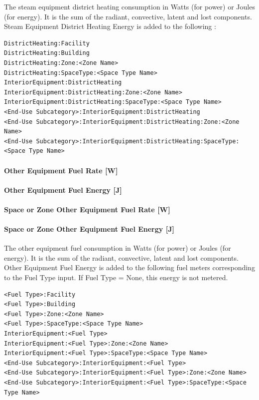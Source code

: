 The steam equipment district heating consumption in Watts (for power) or Joules (for energy). It is the sum of the radiant, convective, latent and lost components. Steam Equipment District Heating Energy is added to the following :

\begin{lstlisting}
DistrictHeating:Facility
DistrictHeating:Building
DistrictHeating:Zone:<Zone Name>
DistrictHeating:SpaceType:<Space Type Name>
InteriorEquipment:DistrictHeating
InteriorEquipment:DistrictHeating:Zone:<Zone Name>
InteriorEquipment:DistrictHeating:SpaceType:<Space Type Name>
<End-Use Subcategory>:InteriorEquipment:DistrictHeating
<End-Use Subcategory>:InteriorEquipment:DistrictHeating:Zone:<Zone Name>
<End-Use Subcategory>:InteriorEquipment:DistrictHeating:SpaceType:<Space Type Name>
\end{lstlisting}

\paragraph{Other Equipment Fuel Rate {[}W{]}}\label{otherequip-fuel-rate}

\paragraph{Other Equipment Fuel Energy {[}J{]}}\label{otherequip-fuel-energy}

\paragraph{Space or Zone Other Equipment Fuel Rate {[}W{]}}\label{zone-otherequip-fuel-rate}

\paragraph{Space or Zone Other Equipment Fuel Energy {[}J{]}}\label{zone-otherequip-fuel-energy}

The other equipment fuel consumption in Watts (for power) or Joules (for energy). It is the sum of the radiant, convective, latent and lost components. Other Equipment Fuel Energy is added to the following fuel meters corresponding to the Fuel Type input. If Fuel Type = None, this energy is not metered.

\begin{lstlisting}
<Fuel Type>:Facility
<Fuel Type>:Building
<Fuel Type>:Zone:<Zone Name>
<Fuel Type>:SpaceType:<Space Type Name>
InteriorEquipment:<Fuel Type>
InteriorEquipment:<Fuel Type>:Zone:<Zone Name>
InteriorEquipment:<Fuel Type>:SpaceType:<Space Type Name>
<End-Use Subcategory>:InteriorEquipment:<Fuel Type>
<End-Use Subcategory>:InteriorEquipment:<Fuel Type>:Zone:<Zone Name>
<End-Use Subcategory>:InteriorEquipment:<Fuel Type>:SpaceType:<Space Type Name>
\end{lstlisting}

